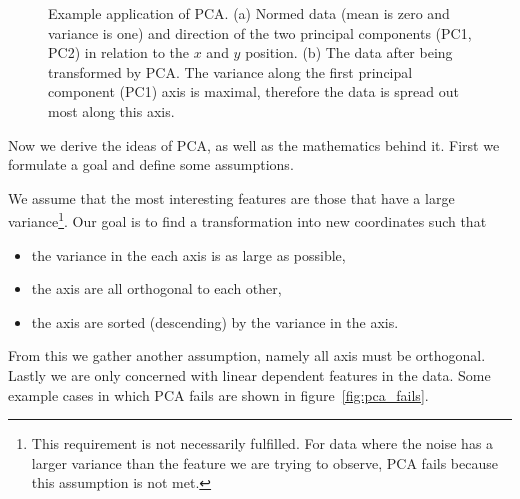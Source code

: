 \begin{figure}
	\centering
	\begin{subfigure}{0.45\linewidth}
		
		\caption{}
		\label{fig:some_nice_data_pc}
	\end{subfigure}
	\hfill
	\begin{subfigure}{0.45\linewidth}
		
		\caption{}
		\label{fig:some_nice_data_pca}
	\end{subfigure}
	
	\caption{Example application of PCA. \newline (a) Normed data (mean is zero and variance is one) and direction of the two principal components (PC1, PC2) in relation to the $x$ and $y$ position. \newline (b) The data after being transformed by PCA. The variance along the first principal component (PC1) axis is maximal, therefore the data is spread out most along this axis.}
	\label{fig:pca_example}
\end{figure}

Now we derive the ideas of PCA, as well as the mathematics behind it. First we formulate a goal and define some assumptions.

We assume that the most interesting features are those that have a large variance\footnote{\color{change} This requirement is not necessarily fulfilled. \color{black} For data where the noise has a larger variance than the feature we are trying to observe, PCA fails because this assumption is not met.}. Our goal is to find a transformation into new coordinates such that
\begin{itemize}
	\item the variance in the each axis is as large as possible,
	\item the axis are all orthogonal to each other,
	\item the axis are sorted (descending) by the variance in the axis.
\end{itemize}

\color{change} From this we gather another assumption, namely all axis must be orthogonal. \color{black} Lastly we are only concerned with linear dependent features in the data. Some example cases in which PCA fails are shown in figure~\ref{fig:pca_fails}.

\newpage

